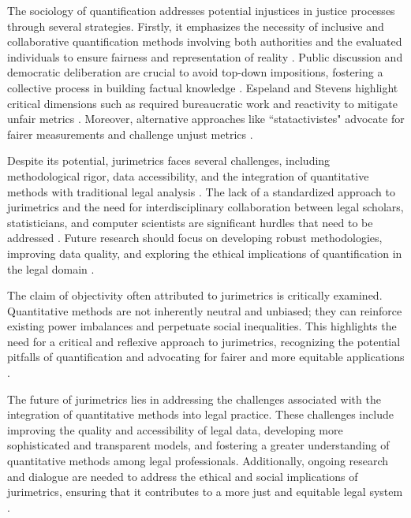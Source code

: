 The sociology of quantification addresses potential injustices in justice processes through several strategies. Firstly, it emphasizes the necessity of inclusive and collaborative quantification methods involving both authorities and the evaluated individuals to ensure fairness and representation of reality \cite{salais2016}. Public discussion and democratic deliberation are crucial to avoid top-down impositions, fostering a collective process in building factual knowledge \cite{salais2016}. Espeland and Stevens highlight critical dimensions such as required bureaucratic work and reactivity to mitigate unfair metrics \cite{saltelli2020}. Moreover, alternative approaches like “statactivistes" advocate for fairer measurements and challenge unjust metrics \cite{saltelli2020}.

Despite its potential, jurimetrics faces several challenges, including methodological rigor, data accessibility, and the integration of quantitative methods with traditional legal analysis \cite{nunes2016jurimetria}. The lack of a standardized approach to jurimetrics and the need for interdisciplinary collaboration between legal scholars, statisticians, and computer scientists are significant hurdles that need to be addressed \cite{101111lsi12334}. Future research should focus on developing robust methodologies, improving data quality, and exploring the ethical implications of quantification in the legal domain \cite{101057s4159902003965}.

The claim of objectivity often attributed to jurimetrics is critically examined. Quantitative methods are not inherently neutral and unbiased; they can reinforce existing power imbalances and perpetuate social inequalities. This highlights the need for a critical and reflexive approach to jurimetrics, recognizing the potential pitfalls of quantification and advocating for fairer and more equitable applications \cite{10.1590/data.2022.65.3.267,10.1057/s41599-020-00557-0}.

The future of jurimetrics lies in addressing the challenges associated with the integration of quantitative methods into legal practice. These challenges include improving the quality and accessibility of legal data, developing more sophisticated and transparent models, and fostering a greater understanding of quantitative methods among legal professionals. Additionally, ongoing research and dialogue are needed to address the ethical and social implications of jurimetrics, ensuring that it contributes to a more just and equitable legal system \cite{ribeiro2021quantification}.

